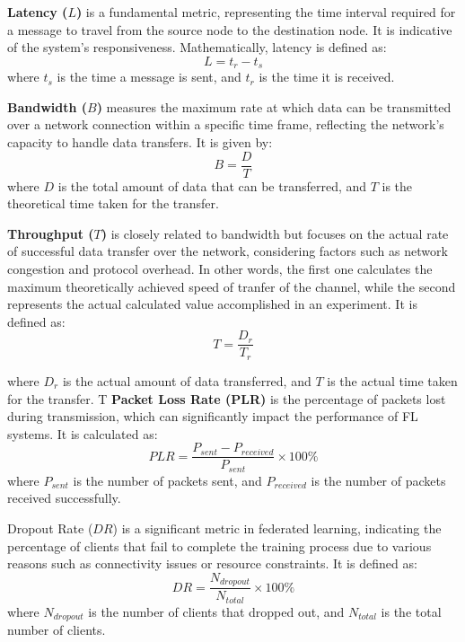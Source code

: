 \textbf{Latency (\(L\))} is a fundamental metric, representing the time interval required for a message to travel
from the source node to the destination node. It is indicative of the system's responsiveness. Mathematically, latency is defined as:
\[
    L = t_r - t_s
\]
where \( t_s \) is the time a message is sent, and \( t_r \) is the time it is received.


\textbf{Bandwidth (\(B\))} measures the maximum rate at which data can be transmitted over a network connection within a specific
time frame, reflecting the network's capacity to handle data transfers. It is given by:
\[
    B = \frac{D}{T}
\]
where \( D \) is the total amount of data that can be transferred, and \( T \) is the theoretical time taken for the transfer.

\textbf{Throughput (\(T\))} is closely related to bandwidth but focuses on the actual rate of successful data transfer over the network,
considering factors such as network congestion and protocol overhead. In other words, the first one calculates the maximum  theoretically achieved
speed of tranfer of the channel, while the second represents the actual calculated value accomplished in an experiment.
It is defined as:
\[
    T = \frac{D_r}{T_r}
\]

where \( D_r \) is the actual amount of data transferred, and \( T \) is the actual time taken for the transfer. T
\textbf{Packet Loss Rate (PLR)} is the percentage of packets lost during transmission, which can significantly impact the performance of FL systems.
It is calculated as:
\[
    PLR = \frac{P_{sent} - P_{received}}{P_{sent}} \times 100\%
\]
where \( P_{sent} \) is the number of packets sent, and \( P_{received} \) is the number of packets received successfully.


Dropout Rate (\(DR\)) is a significant metric in federated learning, indicating the percentage of clients that fail to complete the training
process due to various reasons such as connectivity issues or resource constraints. It is defined as:
\[
    DR = \frac{N_{dropout}}{N_{total}} \times 100\%
\]
where \( N_{dropout} \) is the number of clients that dropped out, and \( N_{total} \) is the total number of clients.

